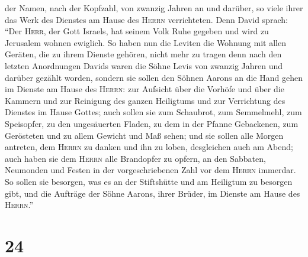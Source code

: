 der Namen, nach der Kopfzahl, von zwanzig Jahren an und darüber, so
viele ihrer das Werk des Dienstes am Hause des \textsc{Herrn}
verrichteten.  Denn David sprach: ``Der \textsc{Herr},
der Gott Israels, hat seinem Volk Ruhe gegeben und wird zu Jerusalem
wohnen ewiglich.  So haben nun die Leviten die Wohnung
mit allen Geräten, die zu ihrem Dienste gehören, nicht mehr zu tragen
 denn nach den letzten Anordnungen Davids waren die Söhne
Levis von zwanzig Jahren und darüber gezählt worden, 
sondern sie sollen den Söhnen Aarons an die Hand gehen im Dienste am
Hause des \textsc{Herrn}: zur Aufsicht über die Vorhöfe und über die
Kammern und zur Reinigung des ganzen Heiligtums und zur Verrichtung des
Dienstes im Hause Gottes;  auch sollen sie zum Schaubrot,
zum Semmelmehl, zum Speisopfer, zu den ungesäuerten Fladen, zu dem in
der Pfanne Gebackenen, zum Gerösteten und zu allem Gewicht und Maß
sehen;  und sie sollen alle Morgen antreten, dem
\textsc{Herrn} zu danken und ihn zu loben, desgleichen auch am Abend;
 auch haben sie dem \textsc{Herrn} alle Brandopfer zu
opfern, an den Sabbaten, Neumonden und Festen in der vorgeschriebenen
Zahl vor dem \textsc{Herrn} immerdar.  So sollen sie
besorgen, was es an der Stiftshütte und am Heiligtum zu besorgen gibt,
und die Aufträge der Söhne Aarons, ihrer Brüder, im Dienste am Hause des
\textsc{Herrn}.''

\hypertarget{section-23}{%
\section{24}\label{section-23}}

